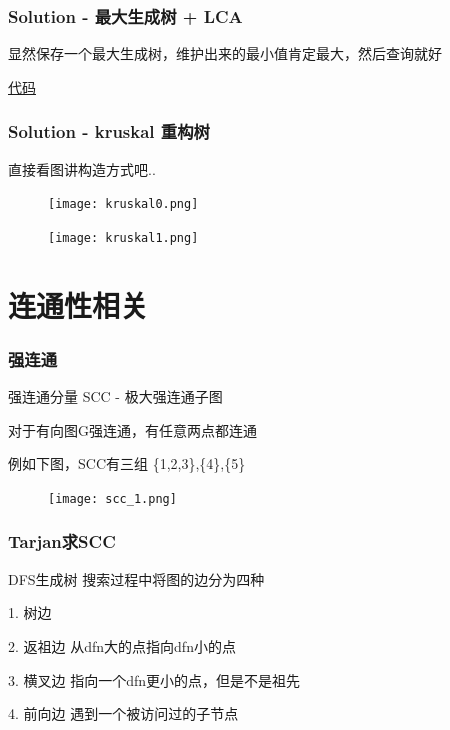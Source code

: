 \documentclass{beamer}
\begin{document}
  \begin{frame}
    \frametitle{Solution - 最大生成树 + LCA}

    显然保存一个最大生成树，维护出来的最小值肯定最大，然后查询就好

    \vspace*{1\baselineskip}
    
    \href{http://syh521.cn/file/P1967.cpp}{代码}
  \end{frame}

  \begin{frame}
    \frametitle{Solution - kruskal 重构树}
    直接看图讲构造方式吧..

    \begin{figure}[htbp]
      \centering
      \begin{minipage}[t]{0.48\textwidth}
      \centering
      \texttt{[image: kruskal0.png]}
      \end{minipage}
      \begin{minipage}[t]{0.48\textwidth}
      \centering
      \texttt{[image: kruskal1.png]}
      \end{minipage}
    \end{figure}
  \end{frame}

  \section{连通性相关}

  \begin{frame}
    \frametitle{强连通}

    强连通分量 SCC - 极大强连通子图

    \vspace*{1\baselineskip}

    对于有向图G强连通，有任意两点都连通

    例如下图，SCC有三组 \{1,2,3\},\{4\},\{5\}

    \begin{figure}
      \texttt{[image: scc\_1.png]}
    \end{figure}
  \end{frame}

  \begin{frame}
    \frametitle{Tarjan求SCC}
    \begin{block}{DFS生成树}
      搜索过程中将图的边分为四种

      1. 树边

      2. 返祖边 从dfn大的点指向dfn小的点

      3. 横叉边 指向一个dfn更小的点，但是不是祖先

      4. 前向边 遇到一个被访问过的子节点
    \end{block}
  \end{frame}
\end{document}
